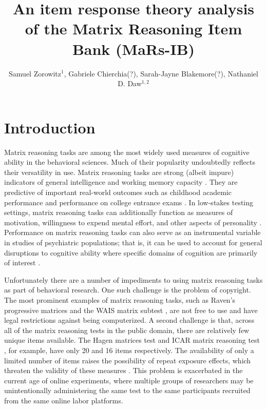 \documentclass[a4paper,man,natbib]{apa6}
\title{An item response theory analysis of the Matrix Reasoning Item Bank (MaRs-IB)}
\author{Samuel Zorowitz$^1$, Gabriele Chierchia(?), Sarah-Jayne Blakemore(?), Nathaniel D. Daw$^{1,2}$}
\affiliation{$^1$Princeton Neuroscience Institute, Princeton University, USA\\$^2$Department of Psychology, Princeton University, USA}
\begin{document}
\maketitle

\section{Introduction}

Matrix reasoning tasks are among the most widely used measures of cognitive ability in the behavioral sciences. Much of their popularity undoubtedly reflects their versatility in use. Matrix reasoning tasks are strong (albeit impure) indicators of general intelligence \citep{gignac2015raven} and working memory capacity \citep{kane2004generality, unsworth2005working}. They are predictive of important real-world outcomes such as childhood academic performance \citep{roth2015intelligence} and performance on college entrance exams \citep{frey2004scholastic, koenig2008act}. In low-stakes testing settings, matrix reasoning tasks can additionally function as measures of motivation, willingness to expend mental effort, and other aspects of personality \citep{duckworth2011role, gignac2019maximum}. Performance on matrix reasoning tasks can also serve as an instrumental variable in studies of psychiatric populations; that is, it can be used to account for general disruptions to cognitive ability where specific domains of cognition are primarily of interest \citep{gillan2016characterizing, rouault2018psychiatric, moutoussis2021decision}.

Unfortunately there are a number of impediments to using matrix reasoning tasks as part of behavioral research. One such challenge is the problem of copyright. The most prominent examples of matrix reasoning tasks, such as Raven's progressive matrices \citep{raven2003raven} and the WAIS matrix subtest \citep{wechsler1999wechsler}, are not free to use and have legal restrictions against being computerized. A second challenge is that, across all of the matrix reasoning tests in the public domain, there are relatively few unique items available. The Hagen matrices test \citep{heydasch2014hagen} and ICAR matrix reasoning test \citep{condon2014international}, for example, have only 20 and 16 items respectively. The availability of only a limited number of items raises the possibility of repeat exposure effects, which threaten the validity of these measures  \citep{ng1974applicability, bors2003effect}. This problem is exacerbated in the current age of online experiments, where multiple groups of researchers may be unintentionally administering the same test to the same participants recruited from the same online labor platforms.
\end{document}
